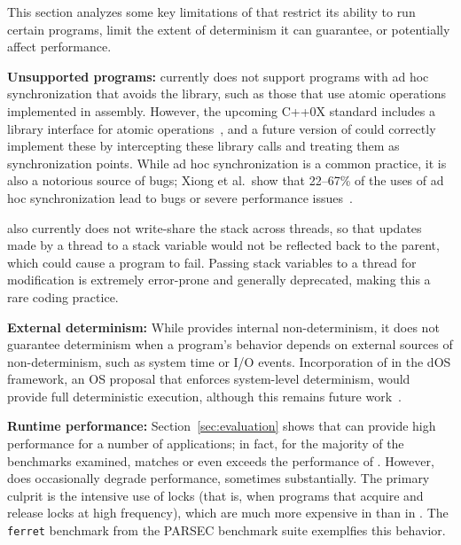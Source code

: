 \label{sec:discussion}

This section analyzes some key limitations of \dthreads{} that
restrict its ability to run certain programs, limit the extent of
determinism it can guarantee, or potentially affect performance.



\textbf{Unsupported programs: }
\dthreads{} currently does not support programs with ad hoc
synchronization that avoids the \pthreads{} library, such as those
that use atomic operations implemented in assembly.  However, the
upcoming C++0X standard includes a library interface for atomic
operations~\cite[pp. 1107--1128]{c++0xstandarddraft}, and a future
version of \dthreads{} could correctly implement these by intercepting
these library calls and treating them as synchronization points. While
ad hoc synchronization is a common practice, it is also a notorious
source of bugs; Xiong et al.\ show that 22--67\% of the uses of ad hoc
synchronization lead to bugs or severe performance
issues~\cite{ad-hoc-considered-harmful}.

\dthreads{} also currently does not write-share the stack
across threads, so that updates made by a thread to a stack variable
would not be reflected back to the parent, which could cause a program
to fail. Passing stack variables to a thread for modification is
extremely error-prone and generally deprecated, making this a rare
coding practice.

\textbf{External determinism: }
While \dthreads{} provides internal non-determinism, it does not
guarantee determinism when a program's behavior depends on external
sources of non-determinism, such as system time or I/O
events. Incorporation of \dthreads{} in the dOS framework, an OS
proposal that enforces system-level determinism, would provide full
deterministic execution, although this remains future
work~\cite{deterministic-process-groups}.

\textbf{Runtime performance: }
Section~\ref{sec:evaluation} shows that \dthreads{} can provide high
performance for a number of applications; in fact, for the majority of
the benchmarks examined, \dthreads{} matches or even exceeds the
performance of \pthreads{}. However, \dthreads{} does occasionally
degrade performance, sometimes substantially. The primary culprit is
the intensive use of locks (that is, when programs that acquire and
release locks at high frequency), which are much more expensive
in \dthreads{} than in \pthreads{}. The \texttt{ferret} benchmark from
the PARSEC benchmark suite exemplfies this behavior.

